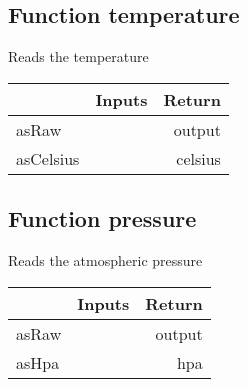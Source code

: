 \documentclass[a4paper,12pt,oneside,pdflatex,italian,final,twocolumn]{article}
\begin{document}
\raggedright
\subsection{Function temperature }
Reads the temperature \\

\centering
\begin{tabular}{lcr}
\toprule
  & Inputs & Return \\
\midrule
asRaw &
&
output
\\
asCelsius &
&
celsius
\\
\bottomrule
\end{tabular}



\raggedright
\subsection{Function pressure }
Reads the atmospheric pressure \\

\centering
\begin{tabular}{lcr}
\toprule
  & Inputs & Return \\
\midrule
asRaw &
&
output
\\
asHpa &
&
hpa
\\
\bottomrule
\end{tabular}



\raggedright
\end{document}
